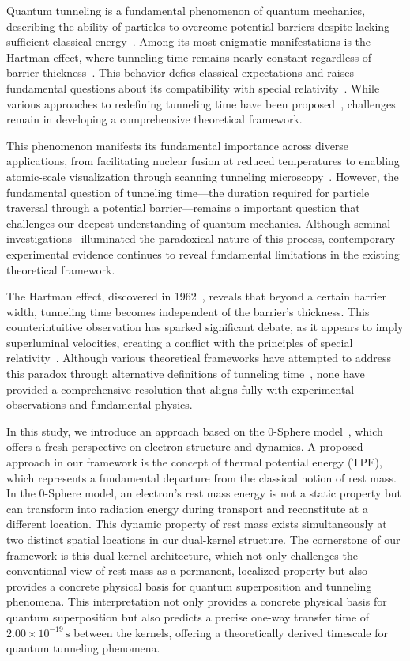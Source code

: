 \documentclass[%
 reprint,
 amsmath,amssymb,
 aps,
]{revtex4-1}
\numberwithin{equation}{section}%
\begin{document}
Quantum tunneling is a fundamental phenomenon of quantum mechanics, describing the ability of particles to overcome potential barriers despite lacking sufficient classical energy~\cite{griffiths2018, cohen2019}. Among its most enigmatic manifestations is the Hartman effect, where tunneling time remains nearly constant regardless of barrier thickness~\cite{hartman1962}. This behavior defies classical expectations and raises fundamental questions about its compatibility with special relativity~\cite{winful2006, buttiker1983}. While various approaches to redefining tunneling time have been proposed~\cite{buttiker1982, landauer1989}, challenges remain in developing a comprehensive theoretical framework.

This phenomenon manifests its fundamental importance across diverse applications, from facilitating nuclear fusion at reduced temperatures to enabling atomic-scale visualization through scanning tunneling microscopy~\cite{razavy2003, eigler1990}. However, the fundamental question of tunneling time—the duration required for particle traversal through a potential barrier—remains a important question that challenges our deepest understanding of quantum mechanics. Although seminal investigations~\cite{maccoll1932, hauge1989} illuminated the paradoxical nature of this process, contemporary experimental evidence continues to reveal fundamental limitations in the existing theoretical framework.

The Hartman effect, discovered in 1962~\cite{hartman1962}, reveals that beyond a certain barrier width, tunneling time becomes independent of the barrier’s thickness. This counterintuitive observation has sparked significant debate, as it appears to imply superluminal velocities, creating a conflict with the principles of special relativity~\cite{winful2006, buttiker1983}. Although various theoretical frameworks have attempted to address this paradox through alternative definitions of tunneling time~\cite{buttiker1982, landauer1989}, none have provided a comprehensive resolution that aligns fully with experimental observations and fundamental physics.

In this study, we introduce an approach based on the 0-Sphere model~\cite{hanamura2023}, which offers a fresh perspective on electron structure and dynamics. A proposed approach in our framework is the concept of thermal potential energy (TPE), which represents a fundamental departure from the classical notion of rest mass. In the 0-Sphere model, an electron's rest mass energy is not a static property but can transform into radiation energy during transport and reconstitute at a different location. This dynamic property of rest mass exists simultaneously at two distinct spatial locations in our dual-kernel structure. The cornerstone of our framework is this dual-kernel architecture, which not only challenges the conventional view of rest mass as a permanent, localized property but also provides a concrete physical basis for quantum superposition and tunneling phenomena. This interpretation not only provides a concrete physical basis for quantum superposition but also predicts a precise one-way transfer time of \( 2.00 \times 10^{-19} \, \mathrm{s} \) between the kernels, offering a theoretically derived timescale for quantum tunneling phenomena.
\end{document}
